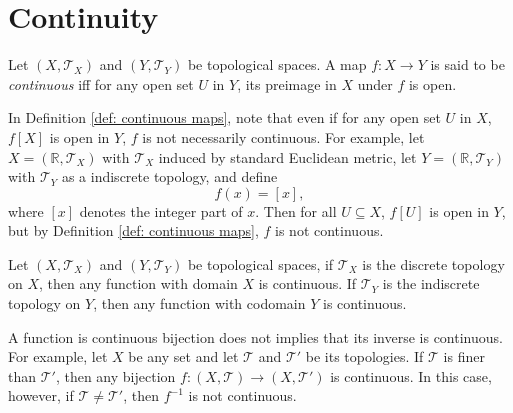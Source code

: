 \section{Continuity}




\begin{definition}
	\label{def: continuous maps}
	Let $(X, \mathcal T_X)$ and $(Y, \mathcal T_Y)$ be topological spaces. A map $f: X \to Y$ is said to be \textit{continuous} iff for any open set $U$ in $Y$, its preimage in $X$ under $f$ is open.
\end{definition}


\begin{note}
	In Definition \ref{def: continuous maps}, note that even if for any open set $U$ in $X$, $f[X]$ is open in $Y$, $f$ is not necessarily continuous. For example, let $X = (\mathbb R, \mathcal T_X)$ with $\mathcal T_X$ induced by standard Euclidean metric, let $Y=(\mathbb R, \mathcal T_Y)$ with $\mathcal T_Y$ as a indiscrete topology, and define
	$$
	f(x) = [x],
	$$
	where $[x]$ denotes the integer part of $x$. Then for all $U \subseteq X$, $f[U]$ is open in $Y$, but by Definition \ref{def: continuous maps}, $f$ is not continuous.
\end{note}


\begin{note}
	Let $(X, \mathcal T_X)$ and $(Y, \mathcal T_Y)$ be topological spaces, if $\mathcal T_X$ is the discrete topology on $X$, then any function with domain $X$ is continuous. If $\mathcal T_Y$ is the indiscrete topology on $Y$, then any function with codomain $Y$ is continuous.
\end{note}


\begin{note}
	A function is continuous bijection does not implies that its inverse is continuous. For example, let $X$ be any set and let $\mathcal T$ and $\mathcal T'$ be its topologies. If $\mathcal T$ is finer than $\mathcal T'$, then any bijection $f: (X, \mathcal T) \to (X, \mathcal T')$ is continuous. In this case, however, if $\mathcal T \ne \mathcal T'$, then $f^{-1}$ is not continuous.
\end{note}


